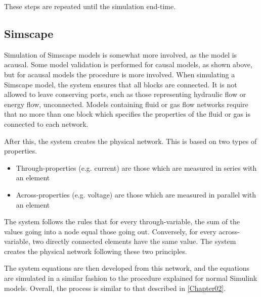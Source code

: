 \documentclass[\rootfolder/main.tex]{subfiles}
\begin{document}
These steps are repeated until the simulation end-time.

\subsection{Simscape}

Simulation of Simscape models is somewhat more involved, as the model is acausal.
Some model validation is performed for causal models, as shown above, but for acausal models the procedure is more involved.
When simulating a Simscape model, the system ensures that all blocks are connected.
It is not allowed to leave conserving ports, such as those representing hydraulic flow or energy flow, unconnected.
Models containing fluid or gas flow networks require that no more than one block which specifies the properties of the fluid or gas is connected to each network.

After this, the system creates the physical network.
This is based on two types of properties.

\begin{itemize}
    \item Through-properties (e.g. current) are those which are measured in series with an element
    \item Across-properties (e.g. voltage) are those which are measured in parallel with an element
\end{itemize}

The system follows the rules that for every through-variable, the sum of the values going into a node equal those going out.
Conversely, for every across-variable, two directly connected elements have the same value.
The system creates the physical network following these two principles.

The system equations are then developed from this network, and the equations are simulated in a similar fashion to the procedure explained for normal Simulink models.
Overall, the process is similar to that described in \cref{Chapter02}.
\end{document}
